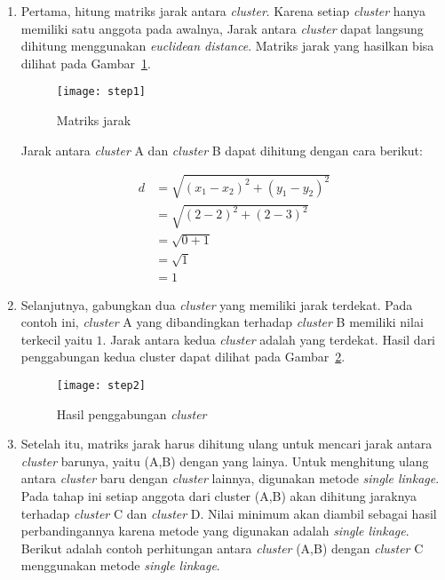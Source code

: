 \begin{enumerate}

\item Pertama, hitung matriks jarak antara \textit{cluster}. Karena setiap \textit{cluster} hanya memiliki satu anggota pada awalnya, Jarak antara \textit{cluster} dapat langsung dihitung  menggunakan \textit{euclidean distance}. Matriks jarak yang hasilkan bisa dilihat pada Gambar~\ref{fig:step1}.

\begin{figure}[H]
    \centering  
    \texttt{[image: step1]}  
    \caption[Matriks jarak]{Matriks jarak} 
    \label{fig:step1} 
\end{figure}

Jarak antara \textit{cluster} A dan \textit{cluster} B dapat dihitung dengan cara berikut:





\begin{equation}
\begin{split}
d & = \sqrt{(x_{1} - x_{2})^2+(y_{1} - y_{2})^2} \\
& = \sqrt{(2 - 2)^2+(2 - 3)^2} \\
& = \sqrt{0 + 1} \\
& = \sqrt{1} \\
& = 1 
\end{split}
\end{equation}


\item Selanjutnya, gabungkan dua \textit{cluster} yang memiliki jarak terdekat. Pada contoh ini,  \textit{cluster} A yang dibandingkan terhadap \textit{cluster} B memiliki nilai terkecil yaitu $1$. Jarak antara kedua \textit{cluster} adalah yang terdekat. Hasil dari penggabungan kedua cluster dapat dilihat pada Gambar~\ref{fig:step2}.

\begin{figure}[H]
    \centering  
    \texttt{[image: step2]}  
    \caption[Hasil penggabungan \textit{cluster}]{Hasil penggabungan \textit{cluster}} 
    \label{fig:step2} 
\end{figure}

\item Setelah itu, matriks jarak harus dihitung ulang untuk mencari jarak antara \textit{cluster} barunya, yaitu (A,B) dengan yang lainya. Untuk menghitung ulang antara \textit{cluster} baru dengan \textit{cluster} lainnya, digunakan metode \textit{single linkage}. Pada tahap ini setiap anggota dari cluster (A,B) akan dihitung jaraknya terhadap \textit{cluster} C dan \textit{cluster} D. Nilai minimum akan diambil sebagai hasil perbandingannya karena metode yang digunakan adalah \textit{single linkage}. Berikut adalah contoh perhitungan antara \textit{cluster} (A,B) dengan \textit{cluster} C menggunakan metode \textit{single linkage}.



\end{enumerate}
